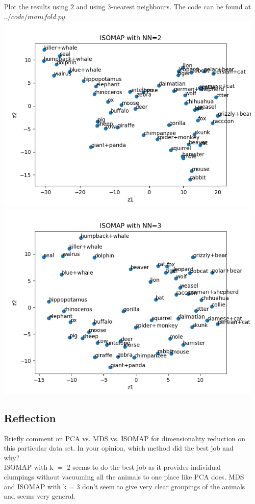 \documentclass{article}
\def\blu#1{{\color{blu}#1}}
\def\gre#1{{\color{gre}#1}}
\begin{document}
\blu{Plot the results using $2$ and using $3$-nearest neighbours}.
\gre{
The code can be found at $../code/manifold.py$.
}
\\
\includegraphics[scale=0.75]{../figs/q4_1_isomap_k=2.png}
\\
\includegraphics[scale=0.75]{../figs/q4_1_isomap_k=3.png}

\subsection{Reflection}

\blu{Briefly comment on PCA vs. MDS vs. ISOMAP for dimensionality reduction on this particular data set. In your opinion, which method did the best job and why?}
\\
\gre{
ISOMAP with k $=$ 2 seems to do the best job as it provides individual clumpings without vacuuming all the animals to one place like PCA does. MDS and ISOMAP with k = 3 don't seem to give very clear groupings of the animals and seems very general.
}
\end{document}
